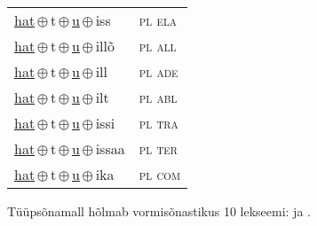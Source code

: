 \begin{minipage}{\textwidth}
\begin{sideways}
\begin{tabular}{l l}
\underline{hat}\,$\oplus$\,t\,$\oplus$\,\underline{u}\,$\oplus$\,iss & \textsc{ pl ela } \\
\underline{hat}\,$\oplus$\,t\,$\oplus$\,\underline{u}\,$\oplus$\,illõ & \textsc{ pl all } \\
\underline{hat}\,$\oplus$\,t\,$\oplus$\,\underline{u}\,$\oplus$\,ill & \textsc{ pl ade } \\
\underline{hat}\,$\oplus$\,t\,$\oplus$\,\underline{u}\,$\oplus$\,ilt & \textsc{ pl abl } \\
\underline{hat}\,$\oplus$\,t\,$\oplus$\,\underline{u}\,$\oplus$\,issi & \textsc{ pl tra } \\
\underline{hat}\,$\oplus$\,t\,$\oplus$\,\underline{u}\,$\oplus$\,issaa & \textsc{ pl ter } \\
\underline{hat}\,$\oplus$\,t\,$\oplus$\,\underline{u}\,$\oplus$\,ika & \textsc{ pl com } \\
\end{tabular}
\end{sideways}
\label{tab:tüüpsõnamall-hattu}

\end{minipage}

 
\vspace{1em}
\noindent Tüüpsõnamall  hõlmab vormisõnastikus 10 lekseemi:  ja .
